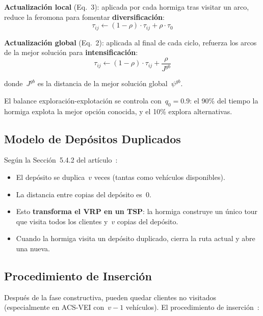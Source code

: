 \documentclass[12pt, letterpaper]{article}
\begin{document}
\textbf{Actualización local} (Eq.~3): aplicada por cada hormiga tras visitar un arco, reduce la feromona para fomentar \textbf{diversificación}:
\begin{equation}
  \tau_{ij} \leftarrow (1 - \rho) \cdot \tau_{ij} + \rho \cdot \tau_0
  \label{eq:local_update}
\end{equation}

\textbf{Actualización global} (Eq.~2): aplicada al final de cada ciclo, refuerza los arcos de la mejor solución para \textbf{intensificación}:
\begin{equation}
  \tau_{ij} \leftarrow (1 - \rho) \cdot \tau_{ij} + \frac{\rho}{J^{gb}}
  \label{eq:global_update}
\end{equation}

\noindent donde~$J^{gb}$ es la distancia de la mejor solución global~$\psi^{gb}$.

El balance exploración-explotación se controla con~$q_0 = 0.9$: el 90\% del tiempo la hormiga explota la mejor opción conocida, y el 10\% explora alternativas.

\subsection{Modelo de Depósitos Duplicados}

Según la Sección~5.4.2 del artículo~\cite{gambardella1999}:

\begin{itemize}[leftmargin=2cm]
  \item El depósito se duplica~$v$ veces (tantas como vehículos disponibles).
  \item La distancia entre copias del depósito es~$0$.
  \item Esto \textbf{transforma el VRP en un TSP}: la hormiga construye un único tour que visita todos los clientes y~$v$ copias del depósito.
  \item Cuando la hormiga visita un depósito duplicado, cierra la ruta actual y abre una nueva.
\end{itemize}

\subsection{Procedimiento de Inserción}

Después de la fase constructiva, pueden quedar clientes no visitados (especialmente en ACS-VEI con~$v-1$ vehículos). El procedimiento de inserción~\cite{gambardella1999}:
\end{document}
